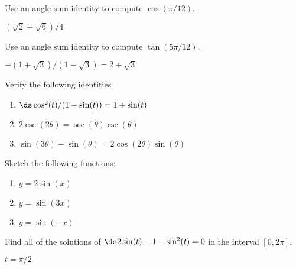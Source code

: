 \begin{enumialphparenastyle}
\begin{ex} 
Use an angle sum identity to compute $\cos(\pi/12)$.
\begin{sol} 
$(\sqrt{2}+\sqrt{6})/4$
\end{sol}
\end{ex}

\begin{ex} 
Use an angle sum identity to compute $\tan(5\pi/12)$.
\begin{sol}
 $-(1+\sqrt3)/(1-\sqrt3)=2+\sqrt3$
\end{sol}
\end{ex}

\begin{ex} Verify the following identities
\begin{enumerate}
	\item	$\ds \cos^2(t)/(1-\sin(t)) = 1+\sin(t)$
	\item	$2\csc(2\theta)=\sec(\theta)\csc(\theta)$
	\item	$\sin(3\theta) - \sin(\theta) = 2\cos(2\theta)\sin(\theta)$
\end{enumerate}
\end{ex}

\begin{ex} Sketch the following functions:
\begin{enumerate}
	\item	$y=2\sin(x)$
	\item	$y=\sin(3x)$
	\item	$y=\sin(-x)$
\end{enumerate}
\end{ex}

\begin{ex} Find all of the solutions of $\ds 2\sin(t) -1 -\sin^2(t) =0$ in the interval $[0,2\pi]$.
\begin{sol}
 $t=\pi/2$
\end{sol}
\end{ex}

\end{enumialphparenastyle}
